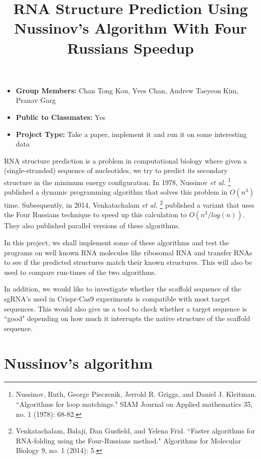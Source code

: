 \documentclass[11pt,a4paper]{article}
\title{RNA Structure Prediction Using Nussinov's Algorithm With Four Russians Speedup}
\author{}
\date{}
\begin{document}
\maketitle

\vspace{-2cm}
\begin{itemize}

\item \textbf{Group Members:} Chan Tong Kou, Yves Chan, Andrew Taeyeon Kim, Pranav Garg
\item \textbf{Public to Classmates:} Yes
\item \textbf{Project Type:} Take a paper, implement it and run it on some interesting data

\end{itemize}


RNA structure prediction is a problem in computational biology where given a (single-stranded) sequence of nucleotides, we try to predict its secondary structure in the minimum energy configuration. In 1978, Nussinov \textit{et al.} \footnote{Nussinov, Ruth, George Pieczenik, Jerrold R. Griggs, and Daniel J. Kleitman. ``Algorithms for loop matchings." SIAM Journal on Applied mathematics 35, no. 1 (1978): 68-82.} published a dynamic programming algorithm that solves this problem in $O(n^3)$ time. Subsequently, in 2014, Venkatachalam \textit{et al.} \footnote{Venkatachalam, Balaji, Dan Gusfield, and Yelena Frid. ``Faster algorithms for RNA-folding using the Four-Russians method." Algorithms for Molecular Biology 9, no. 1 (2014): 5.} published a variant that uses the Four Russians technique to speed up this calculation to $O(n^3/log(n))$. They also published parallel versions of these algorithms.

In this project, we shall implement some of these algorithms and test the programs on well known RNA molecules like ribosomal RNA and transfer RNAs to see if the predicted structures match their known structures. This will also be used to compare run-times of the two algorithms.

In addition, we would like to investigate whether the scaffold sequence of the sgRNA's used in Crispr-Cas9 experiments is compatible with most target sequences. This would also give us a tool to check whether a target sequence is ``good" depending on how much it interrupts the native structure of the scaffold sequence.

\section{Nussinov's algorithm}
\end{document}

